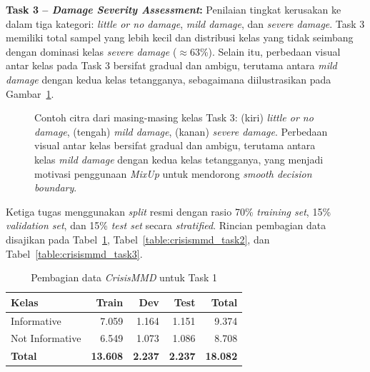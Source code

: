 \textbf{Task 3 -- \textit{Damage Severity Assessment}:} Penilaian
tingkat kerusakan ke dalam tiga kategori: \textit{little or no damage},
\textit{mild damage}, dan \textit{severe damage}. Task 3 memiliki
total sampel yang lebih kecil dan distribusi kelas yang tidak seimbang
dengan dominasi kelas \textit{severe damage} ($\approx$63\%). Selain
itu, perbedaan visual antar kelas pada Task 3 bersifat gradual dan
ambigu, terutama antara \textit{mild damage} dengan kedua kelas
tetangganya, sebagaimana diilustrasikan pada
Gambar~\ref{fig:task3_samples}. \par

\begin{figure}[h]
    \centering
    \fbox{\rule{0pt}{6cm}\rule{0.90\textwidth}{0pt}}
    \caption{Contoh citra dari masing-masing kelas Task 3:
    (kiri) \textit{little or no damage}, (tengah) \textit{mild damage},
    (kanan) \textit{severe damage}. Perbedaan visual antar kelas
    bersifat gradual dan ambigu, terutama antara kelas \textit{mild
    damage} dengan kedua kelas tetangganya, yang menjadi motivasi
    penggunaan \textit{MixUp} untuk mendorong \textit{smooth decision
    boundary}.}
    \label{fig:task3_samples}
\end{figure}

Ketiga tugas menggunakan \textit{split} resmi dengan rasio 70\%
\textit{training set}, 15\% \textit{validation set}, dan 15\%
\textit{test set} secara \textit{stratified}. Rincian pembagian data
disajikan pada Tabel~\ref{table:crisismmd_task1},
Tabel~\ref{table:crisismmd_task2}, dan
Tabel~\ref{table:crisismmd_task3}. \par

\begin{table}[h]
    \centering
    \caption{Pembagian data \textit{CrisisMMD} untuk Task 1
    \cite{alam2018crisismmd}}
    \label{table:crisismmd_task1}
    \begin{tabular}{|l|r|r|r|r|}
        \hline
        \textbf{Kelas} &
        \textbf{Train} &
        \textbf{Dev} &
        \textbf{Test} &
        \textbf{Total} \\
        \hline
        Informative     & 7.059 & 1.164 & 1.151 & 9.374 \\
        Not Informative & 6.549 & 1.073 & 1.086 & 8.708 \\
        \hline
        \textbf{Total}  & \textbf{13.608} & \textbf{2.237} &
                          \textbf{2.237}  & \textbf{18.082} \\
        \hline
    \end{tabular}
\end{table}

